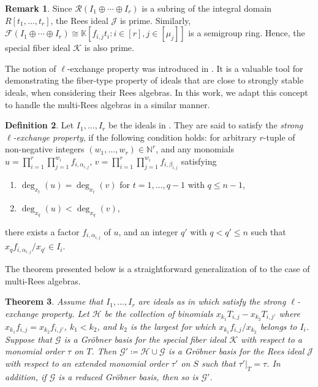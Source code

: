 \documentclass[11pt,a4paper,reqno,dvipsnames]{amsart}
\theoremstyle{plain}
\newtheorem{Theorem}{Theorem}[section]
\theoremstyle{definition}
\newtheorem{Assumptions and Discussion}[Theorem]{Assumptions and Discussion}
\newtheorem{Definition}[Theorem]{Definition}
\newtheorem{Remark}[Theorem]{Remark}
\theoremstyle{remark}
\def\deg{\operatorname{deg}}
\def\KK{{\mathbb K}}
\def\NN{{\mathbb N}}
\newcommand\calF{\mathcal{F}}
\newcommand\calG{\mathcal{G}}
\newcommand\calH{\mathcal{H}}
\newcommand\calJ{\mathcal{J}}
\newcommand\calK{\mathcal{K}}
\newcommand\calR{\mathcal{R}}
\begin{document}
\begin{Remark}
    Since $\calR(I_1 \oplus \cdots \oplus I_r)$ is a subring of the integral domain $R[t_1,\dots,t_r]$, the Rees ideal $\calJ$ is prime. Similarly, $\calF(I_1 \oplus \cdots \oplus I_r)\cong \KK[f_{i,j}t_i:i\in [r],j\in[\mu_j]]$ is a semigroup ring. Hence, the special fiber ideal $\calK$ is also prime.
\end{Remark}


The notion of $\ell$-exchange property was introduced in \cite{MR2195995}. It is a valuable tool for demonstrating the fiber-type property of ideals that are close to strongly stable ideals, when considering their Rees algebras. In this work, we adapt this concept to handle the multi-Rees algebras in a similar manner.

\begin{Definition}
    \label{def:Strong_L_Ex_P}
    Let $I_1, \dots, I_r$ be the ideals in .
    They are said to satisfy the \emph{strong $\ell$-exchange property}, if the
    following condition holds: for arbitrary $r$-tuple of non-negative integers
$(w_1,\dots,w_r)\in \NN^r$, and any monomials
    $u=\prod_{i=1}^r\prod_{j=1}^{w_i} f_{i,\alpha_{i,j}}$,
    $v=\prod_{i=1}^r \prod_{j=1}^{w_i} f_{i,\beta_{i,j}}$ satisfying
    \begin{enumerate}[i]
        \item $\deg_{x_t}(u)=\deg_{x_t}(v)$ for $t=1,\dots,q-1$ with $q\le n-1$,
        \item $\deg_{x_q}(u)<\deg_{x_q}(v)$,
    \end{enumerate}
    there exists a factor $f_{i,\alpha_{i,j}}$ of $u$, and an integer $q'$ with
    $q<q' \le n$ such that $x_qf_{i,\alpha_{i,j}}/x_{q'}\in I_i$.
\end{Definition}




The theorem presented below is a straightforward generalization of \cite[Theorem 5.1]{MR2195995} to the case of multi-Rees algebras.

\begin{Theorem}
    \label{thm:ReesIdeal}
    Assume that $I_1,\dots,I_r$ are ideals as in  which satisfy the strong $\ell$-exchange property.  Let $\calH$ be the collection of binomials $x_{k_1}T_{i,j}-x_{k_2}T_{i,j'}$ where $x_{k_1}f_{i,j}=x_{k_2}f_{i,j'}$, $k_1<k_2$, and $k_2$ is the largest for which $x_{k_1}f_{i,j}/x_{k_2}$ belongs to $I_i$. Suppose that $\mathcal{G}$ is a Gr\"obner basis for the special fiber ideal $\calK$ with respect to a monomial order $\tau$ on $T$. Then $\mathcal{G}' \coloneqq  \calH \cup \mathcal{G}$ is a Gr\"obner basis for the Rees ideal $\calJ$ with respect to an extended monomial order $\tau'$ on $S$ such that $\tau'|_{T}=\tau$.  In addition, if $\calG$ is a reduced Gr\"obner basis, then so is $\calG'$.
\end{Theorem}
\end{document}
